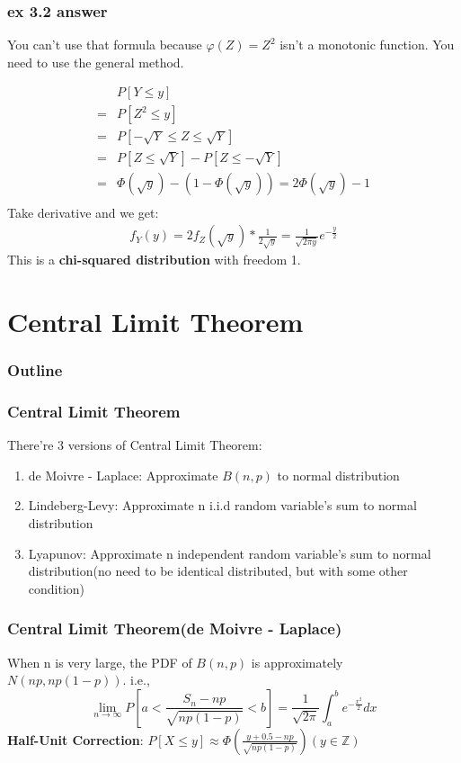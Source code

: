 \documentclass{beamer}
\begin{document}
\begin{frame}
    \frametitle{ex 3.2 answer}
    You can't use that formula because $\varphi(Z)=Z^2$ isn't a monotonic function. You need to use the general method.\par
    \begin{align*}
        & P[Y\leq y]\\
        = & P[Z^2 \leq y]\\
        = & P[-\sqrt{Y} \leq Z\leq \sqrt{Y}]\\
        = & P[Z\leq \sqrt{Y}]-P[Z \leq -\sqrt{Y}]\\
        = & \Phi(\sqrt{y})-(1-\Phi(\sqrt{y}))=2\Phi(\sqrt{y})-1\\
    \end{align*}
    Take derivative and we get:
    \begin{align*}
        f_Y(y)=2f_Z(\sqrt{y})*\frac{1}{2\sqrt{y}}=\frac{1}{\sqrt{2\pi y}}e^{-\frac{y}{2}}
    \end{align*}
    This is a \textbf{chi-squared distribution} with freedom 1.

\end{frame}

\section{Central Limit Theorem}
\begin{frame}
    \frametitle{Outline}
    \tableofcontents[currentsection]
\end{frame}

\begin{frame}
    \frametitle{Central Limit Theorem}
    There're 3 versions of Central Limit Theorem:
    \begin{enumerate}
        \item de Moivre - Laplace: Approximate $B(n,p)$ to normal distribution
        \item Lindeberg-Levy: Approximate n i.i.d random variable's sum to normal distribution
        \item Lyapunov: Approximate n independent random variable's sum to normal distribution(no need to be identical distributed, but with some other condition)
    \end{enumerate}
    

\end{frame}

\begin{frame}
    \frametitle{Central Limit Theorem(de Moivre - Laplace)}
    When n is very large, the PDF of $B(n,p)$ is approximately $N(np, np(1-p))$. i.e., 
    \[\lim_{n\rightarrow \infty}P[a<\frac{S_n-np}{\sqrt{np(1-p)}}<b]=\frac{1}{\sqrt{2\pi}}\int_{a}^{b}e^{-\frac{x^2}{2}}dx\]
    \textbf{Half-Unit Correction}: $P[X\leq y]\approx \Phi(\frac{y+0.5-np}{\sqrt{np(1-p)}})(y\in \mathbb{Z})$

\end{frame}
\end{document}
